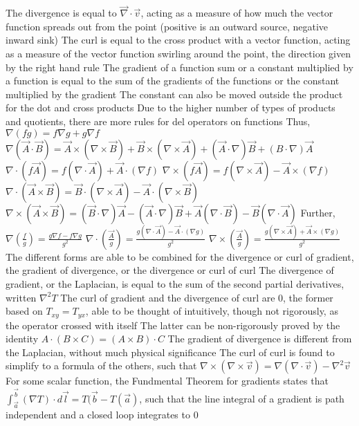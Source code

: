 \documentclass[11 pt, twoside]{article}
\newenvironment{outline*}
{
	\begin{outline}[enumerate]
	}
	{\end{outline}
}
\begin{document}
\begin{outline*}
		\3 The divergence is equal to $\vec{\nabla} \cdot \vec{v}$, acting as a measure of how much the vector function spreads out from the point (positive is an outward source, negative inward sink)
		\3 The curl is equal to the cross product with a vector function, acting as a measure of the vector function swirling around the point, the direction given by the right hand rule
	\2 The gradient of a function sum or a constant multiplied by a function is equal to the sum of the gradients of the functions or the constant multiplied by the gradient
		\3 The constant can also be moved outside the product for the dot and cross products
	\2 Due to the higher number of types of products and quotients, there are more rules for del operators on functions
		\3 Thus, $\nabla(fg) = f\nabla g + g\nabla f$
			\4 $\nabla(\vec{A} \cdot \vec{B}) = \vec{A} \times (\nabla \times \vec{B}) + \vec{B} \times (\nabla \times \vec{A}) + (\vec{A} \cdot \nabla)\vec{B} + (B \cdot \nabla)\vec{A}$
			\4 $\nabla \cdot (f\vec{A}) = f(\nabla \cdot \vec{A}) + \vec{A} \cdot (\nabla f)$
			\4 $\nabla \times (f\vec{A}) = f(\nabla \times \vec{A}) - \vec{A} \times (\nabla f)$
			\4 $\nabla \cdot (\vec{A} \times \vec{B}) = \vec{B} \cdot (\nabla \times \vec{A}) - \vec{A} \cdot (\nabla \times \vec{B})$
			\4 $\nabla \times (\vec{A} \times \vec{B}) = (\vec{B} \cdot \nabla)\vec{A} - (\vec{A} \cdot \nabla)\vec{B} + \vec{A}(\nabla \cdot \vec{B}) - \vec{B}(\nabla \cdot \vec{A})$
		\3 Further, $\nabla (\frac{f}{g}) = \frac{g\nabla f - f\nabla g}{g^2}$
			\4 $\nabla \cdot (\frac{\vec{A}}{g}) = \frac{g(\nabla \cdot \vec{A}) - \vec{A} \cdot (\nabla g)}{g^2}$
			\4 $\nabla \times (\frac{\vec{A}}{g}) = \frac{g(\nabla \times \vec{A}) + \vec{A} \times (\nabla g)}{g^2}$
	\2 The different forms are able to be combined for the divergence or curl of gradient, the gradient of divergence, or the divergence or curl of curl
		\3 The divergence of gradient, or the Laplacian, is equal to the sum of the second partial derivatives, written $\nabla^2 T$
		\3 The curl of gradient and the divergence of curl are 0, the former based on $T_{xy} = T_{yx}$, able to be thought of intuitively, though not rigorously, as the operator crossed with itself
			\4 The latter can be non-rigorously proved by the identity $A \cdot (B \times C) = (A \times B) \cdot C$
		 The gradient of divergence is different from the Laplacian, without much physical significance
		\3 The curl of curl is found to simplify to a formula of the others, such that $\nabla \times (\nabla \times \vec{v}) = \nabla(\nabla \cdot \vec{v}) - \nabla^2 \vec{v}$
\1 For some scalar function, the Fundmental Theorem for gradients states that $\int^{\vec{b}}_{\vec{a}} (\nabla T) \cdot d\vec{l} = T(\vec{b} - T(\vec{a})$, such that the line integral of a gradient is path independent and a closed loop integrates to 0

\end{outline*}
\end{document}
